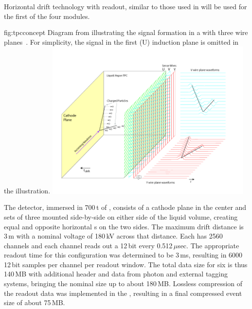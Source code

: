 \documentclass[../main-v1.tex]{subfiles}
\begin{document}
Horizontal drift  technology with  readout, similar to those used in   will be used for the first of the four  modules. 


\begin{dunefigure}
{fig:tpcconcept} %
{Diagram  from    illustrating the signal formation in a  with three wire planes~\cite{Acciarri:2016smi}. For simplicity, the signal in the first (U) induction plane is omitted in the illustration. }
\includegraphics[trim={0cm 0.6cm 2.5cm 0.7cm},clip,height=8cm]{graphics/IntroFigures/Fig_04_LArTPC_Concept.png}
\end{dunefigure}

The  detector, immersed in 700\,t of , consists of %
a cathode plane in the center and sets of three  mounted side-by-side on %
either side of the liquid volume, creating %
equal and opposite horizontal \efield{}s on the two sides. %
The maximum drift distance is  3\,m with a nominal voltage of 180\,kV  across that distance.  Each  has 2560 channels and each channel reads out a 12\,bit  every 0.512\,$\mu$sec. %
The appropriate readout time for this configuration was determined to be 3\,ms, resulting in 6000 12\,bit samples per channel per readout window. 
The total data size for six  is thus 140\,MB with additional header and data from photon and external tagging systems, bringing the nominal  size up to about 180\,MB.  Lossless compression of the  readout data was implemented in the , resulting in a final compressed event size of about 75\,MB. 
\end{document}
